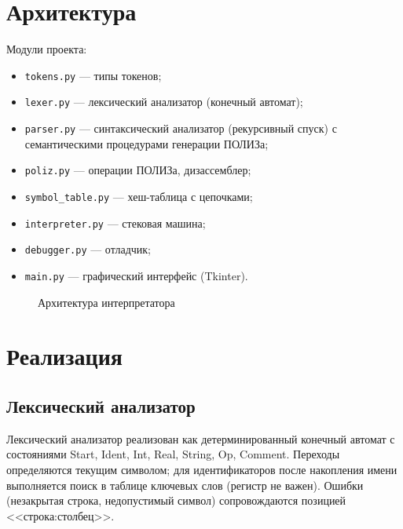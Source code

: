 \documentclass[14pt,a4paper]{article}
\begin{document}
\section{Архитектура}

Модули проекта:
\begin{itemize}
  \item \texttt{tokens.py} — типы токенов;
  \item \texttt{lexer.py} — лексический анализатор (конечный автомат);
  \item \texttt{parser.py} — синтаксический анализатор (рекурсивный
        спуск) с семантическими процедурами генерации ПОЛИЗа;
  \item \texttt{poliz.py} — операции ПОЛИЗа, дизассемблер;
  \item \texttt{symbol\_table.py} — хеш-таблица с цепочками;
  \item \texttt{interpreter.py} — стековая машина;
  \item \texttt{debugger.py} — отладчик;
  \item \texttt{main.py} — графический интерфейс (Tkinter).
\end{itemize}

\begin{figure}[H]
  \centering
  \caption{Архитектура интерпретатора}
  \label{fig:arch}
\end{figure}

\section{Реализация}

\subsection{Лексический анализатор}

Лексический анализатор реализован как детерминированный конечный
автомат с состояниями Start, Ident, Int, Real, String, Op, Comment.
Переходы определяются текущим символом; для идентификаторов после
накопления имени выполняется поиск в таблице ключевых слов (регистр
не важен). Ошибки (незакрытая строка, недопустимый символ)
сопровождаются позицией <<строка:столбец>>.
\end{document}

